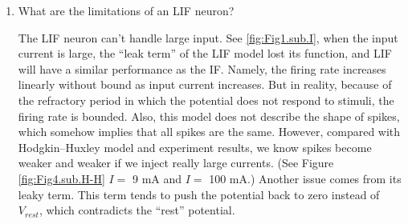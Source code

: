 \documentclass[11pt]{article}
\begin{document}
\begin{enumerate}
		\item What are the limitations of an LIF neuron?
			
		The LIF neuron can't handle large input. See \ref{fig:Fig1.sub.I}, when the input current is large, the ``leak term'' of the LIF model lost its function, and LIF will have a similar performance as the IF. Namely, the firing rate increases linearly without bound as input current increases. But in reality, because of the refractory period in which the potential does not respond to stimuli, the firing rate is bounded. Also, this model does not describe the shape of spikes, which somehow implies that all spikes are the same. However, compared with Hodgkin–Huxley model and experiment results, we know spikes become weaker and weaker if we inject really large currents. (See Figure \ref{fig:Fig4.sub.H-H} $I =$ 9 mA and $I =$ 100 mA.) Another issue comes from its leaky term. This term tends to push the potential back to zero instead of $V_{rest}$, which contradicts the ``rest'' potential.	
			
	\end{enumerate}
	
\end{document}

